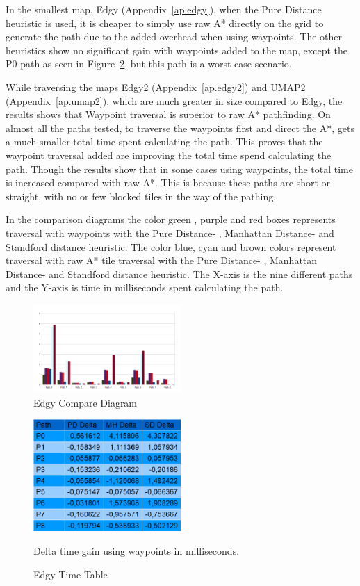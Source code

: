 \documentclass[a4paper]{article}
\begin{document}
In the smallest map, Edgy (Appendix~\ref{ap.edgy}), when the Pure Distance heuristic is used, it is cheaper to simply use raw A* directly on the grid to generate the path due to the added overhead when using waypoints. The other heuristics show no significant gain with waypoints added to the map, except the P0-path as seen in Figure~\ref{fig:Edgy_cd}, but this path is a worst case scenario.
	
While traversing the maps Edgy2 (Appendix~\ref{ap.edgy2}) and UMAP2 (Appendix~\ref{ap.umap2}), which are much greater in size compared to Edgy, the results shows that Waypoint traversal is superior to raw A* pathfinding. On almost all the paths tested, to traverse the waypoints first and direct the A*, gets a much smaller total time spent calculating the path. This proves that the waypoint traversal added are improving the total time spend calculating the path. Though the results show that in some cases using waypoints, the total time is increased compared with raw A*. This is because these paths are short or straight, with no or few blocked tiles in the way of the pathing.
	
In the comparison diagrams the color green , purple and red boxes represents traversal with waypoints with the Pure Distance- , Manhattan Distance- and Standford distance heuristic.
The color blue, cyan and brown colors represent traversal with raw A* tile traversal with the Pure Distance- , Manhattan Distance- and Standford distance heuristic.
The  X-axis is the nine different paths and the Y-axis is time in milliseconds spent calculating the path.

\begin{figure}[h!]
\centering
\includegraphics[width=0.5\textwidth,height=\textheight,keepaspectratio]{ChartsAndFigures/Edgy_d2.png}
\caption{Edgy Compare Diagram}
\label{fig:Edgy_d2}
\end{figure}

\begin{figure}[h!]
\centering
\includegraphics[width=0.5\textwidth,height=\textheight,keepaspectratio]{ChartsAndFigures/Edgy_timeTable.png}
\caption{Edgy Time Table}
Delta time gain using waypoints in milliseconds.
\label{fig:Edgy_cd}
\end{figure}
\end{document}
